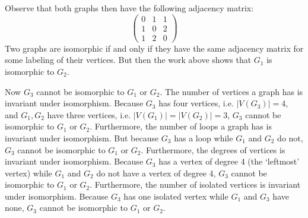 \documentclass[11pt,letterpaper]{article}
\begin{document}
Observe that both graphs then have the following adjacency matrix:
	\[
	\begin{pmatrix}
	0 & 1 & 1 \\
	1 & 0 & 2 \\
	1 & 2 & 0 
	\end{pmatrix}
	\]
Two graphs are isomorphic if and only if they have the same adjacency matrix for some labeling of their vertices. But then the work above shows that $G_1$ is isomorphic to $G_2$. \pspace

Now $G_3$ cannot be isomorphic to $G_1$ or $G_2$. The number of vertices a graph has is invariant under isomorphism. Because $G_3$ has four vertices, i.e. $|V(G_3)|= 4$, and $G_1, G_2$ have three vertices, i.e. $|V(G_1)|= |V(G_2)|= 3$, $G_3$ cannot be isomorphic to $G_1$ or $G_2$. Furthermore, the number of loops a graph has is invariant under isomorphism. But because $G_3$ has a loop while $G_1$ and $G_2$ do not, $G_3$ cannot be isomorphic to $G_1$ or $G_2$. Furthermore, the degrees of vertices is invariant under isomorphism. Because $G_3$ has a vertex of degree 4 (the `leftmost' vertex) while $G_1$ and $G_2$ do not have a vertex of degree 4, $G_3$ cannot be isomorphic to $G_1$ or $G_2$. Furthermore, the number of isolated vertices is invariant under isomorphism. Because $G_3$ has one isolated vertex while $G_1$ and $G_3$ have none, $G_3$ cannot be isomorphic to $G_1$ or $G_2$. 
\end{document}
